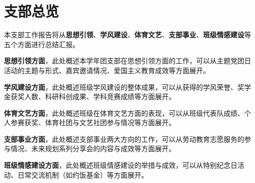 \section{支部总览}

本支部工作报告将从\textbf{思想引领}、\textbf{学风建设}、\textbf{体育文艺}、\textbf{支部事业}、\textbf{班级情感建设}等
五个方面进行总结汇报。


\textbf{思想引领方面}，此处概述本学年团支部在思想引领方面的工作，可以从主题党团日活动的主题与形式、嘉宾邀请情况、爱国主义教育成效等方面展开。

\textbf{学风建设方面}，此处概述班级学风建设的整体成果，可以从获得的学风荣誉、奖学金获奖人数、科研科创成果、学科竞赛成绩等方面展开。

\textbf{体育文艺方面}，此处概述班级在体育文艺方面的表现，可以从班级代表队成绩、个人参赛获奖、体育社团与文艺社团参与情况等方面展开。

\textbf{支部事业方面}，此处概述支部事业两大方向的工作，可以从劳动教育志愿服务的参与情况、未来规划系列分享会的内容与成效等方面展开。

\textbf{班级情感建设方面}，此处概述班级情感建设的举措与成效，可以从特别纪念日活动、日常交流机制（如约饭基金）等方面展开。
